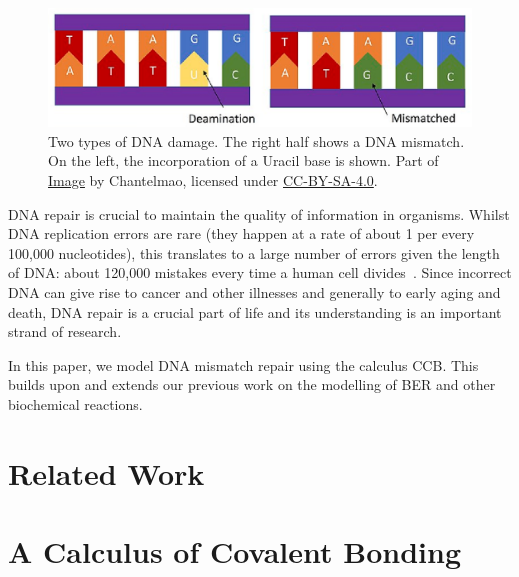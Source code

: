 \documentclass[review]{elsarticle}
\begin{document}
\begin{figure}[h!]
  \centering
    \includegraphics[width=1.0\textwidth]{Types_of_DNA_Damage_part}
  \caption[Two types of DNA damage.]{Two types of DNA damage. The right half shows a DNA mismatch.
  On the left, the incorporation of a Uracil base is shown.
  Part of \href{https://commons.wikimedia.org/wiki/File:Types_of_DNA_Damage.jpg}{Image} by Chantelmao, licensed under \href{https://creativecommons.org/licenses/by-sa/4.0/deed.en}{CC-BY-SA-4.0}.}
  \label{fig:damages}
\end{figure}

DNA repair is crucial to maintain the quality of information in organisms. Whilst DNA replication errors are rare (they happen at a rate of about 1 per every 100,000 nucleotides), this translates to a large number of errors given the length of DNA: about 120,000 mistakes every time a human cell divides~\cite{damage}. Since incorrect DNA can give rise to cancer and other illnesses and generally to early aging and death, DNA repair is a crucial part of life and its understanding is an important strand of research.

In this paper, we model DNA mismatch repair using the calculus CCB. This builds upon and extends our previous work on the modelling of BER and other biochemical reactions.

\section{Related Work}

%
\section{A Calculus of Covalent Bonding}\label{sec:calculus}

%
%
%
\end{document}
